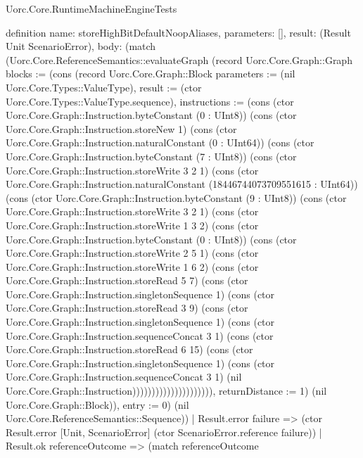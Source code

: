 \begin{lexlean}{Uorc.Core.RuntimeMachineEngineTests}
\begin{semanticmodule}
definition{
  name: storeHighBitDefaultNoopAliases,
  parameters: [],
  result: (Result Unit ScenarioError),
  body: (match (Uorc.Core.ReferenceSemantics::evaluateGraph (record Uorc.Core.Graph::Graph {blocks := (cons (record Uorc.Core.Graph::Block {parameters := (nil Uorc.Core.Types::ValueType), result := (ctor Uorc.Core.Types::ValueType.sequence), instructions := (cons (ctor Uorc.Core.Graph::Instruction.byteConstant (0 : UInt8)) (cons (ctor Uorc.Core.Graph::Instruction.storeNew 1) (cons (ctor Uorc.Core.Graph::Instruction.naturalConstant (0 : UInt64)) (cons (ctor Uorc.Core.Graph::Instruction.byteConstant (7 : UInt8)) (cons (ctor Uorc.Core.Graph::Instruction.storeWrite 3 2 1) (cons (ctor Uorc.Core.Graph::Instruction.naturalConstant (18446744073709551615 : UInt64)) (cons (ctor Uorc.Core.Graph::Instruction.byteConstant (9 : UInt8)) (cons (ctor Uorc.Core.Graph::Instruction.storeWrite 3 2 1) (cons (ctor Uorc.Core.Graph::Instruction.storeWrite 1 3 2) (cons (ctor Uorc.Core.Graph::Instruction.byteConstant (0 : UInt8)) (cons (ctor Uorc.Core.Graph::Instruction.storeWrite 2 5 1) (cons (ctor Uorc.Core.Graph::Instruction.storeWrite 1 6 2) (cons (ctor Uorc.Core.Graph::Instruction.storeRead 5 7) (cons (ctor Uorc.Core.Graph::Instruction.singletonSequence 1) (cons (ctor Uorc.Core.Graph::Instruction.storeRead 3 9) (cons (ctor Uorc.Core.Graph::Instruction.singletonSequence 1) (cons (ctor Uorc.Core.Graph::Instruction.sequenceConcat 3 1) (cons (ctor Uorc.Core.Graph::Instruction.storeRead 6 15) (cons (ctor Uorc.Core.Graph::Instruction.singletonSequence 1) (cons (ctor Uorc.Core.Graph::Instruction.sequenceConcat 3 1) (nil Uorc.Core.Graph::Instruction))))))))))))))))))))), returnDistance := 1}) (nil Uorc.Core.Graph::Block)), entry := 0}) (nil Uorc.Core.ReferenceSemantics::Sequence))
    | Result.error failure => (ctor Result.error [Unit, ScenarioError] (ctor ScenarioError.reference failure))
    | Result.ok referenceOutcome => (match referenceOutcome
}
\end{semanticmodule}
\end{lexlean}
